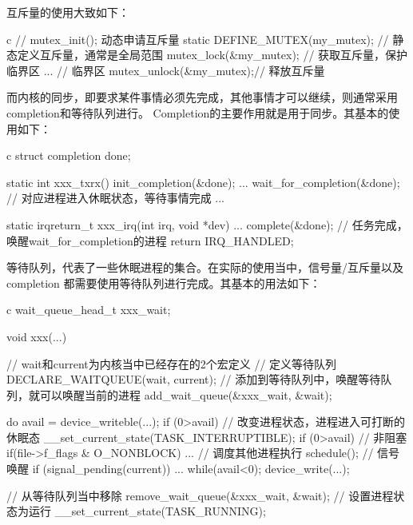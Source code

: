互斥量的使用大致如下：
\begin{code-block}{c}
// mutex_init(); 动态申请互斥量
static DEFINE_MUTEX(my_mutex); // 静态定义互斥量，通常是全局范围
mutex_lock(&my_mutex);  // 获取互斥量，保护临界区
... // 临界区
mutex_unlock(&my_mutex);// 释放互斥量
\end{code-block}

而内核的同步，即要求某件事情必须先完成，其他事情才可以继续，则通常采用completion和等待队列进行。
Completion的主要作用就是用于同步。其基本的使用如下：
\begin{code-block}{c}
struct completion done;

static int xxx_txrx()
{
        init_completion(&done);
        ...
        wait_for_completion(&done); // 对应进程进入休眠状态，等待事情完成
        ...
}

static irqreturn_t xxx_irq(int irq, void *dev)
{
        ...
        complete(&done);            // 任务完成，唤醒wait_for_completion的进程
        return IRQ_HANDLED;
}
\end{code-block}

等待队列，代表了一些休眠进程的集合。在实际的使用当中，信号量/互斥量以及completion
都需要使用等待队列进行完成。其基本的用法如下：
\begin{code-block}{c}
wait_queue_head_t xxx_wait;

void xxx(...)
{
        // wait和current为内核当中已经存在的2个宏定义
        // 定义等待队列
        DECLARE_WAITQUEUE(wait, current);
        // 添加到等待队列中，唤醒等待队列，就可以唤醒当前的进程
        add_wait_queue(&xxx_wait, &wait);

        do {
                avail = device_writeble(...);
                if (0>avail) {
                        // 改变进程状态，进程进入可打断的休眠态
                        __set_current_state(TASK_INTERRUPTIBLE);
                }
                if (0>avail) {
                        // 非阻塞
                        if(file->f_flags & O_NONBLOCK) {
                            ...
                        }
                        // 调度其他进程执行
                        schedule();
                        // 信号唤醒
                        if (signal_pending(current)) {
                            ...
                        }
                }
        } while(avail<0);
        device_write(...);

        // 从等待队列当中移除
        remove_wait_queue(&xxx_wait, &wait);
        // 设置进程状态为运行
        __set_current_state(TASK_RUNNING);
}
\end{code-block}

